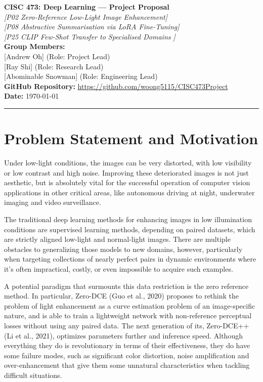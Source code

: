 \documentclass[11pt, letterpaper]{article}
\begin{document}
{\centering
  {\Large\textbf{CISC 473: Deep Learning --- Project Proposal}}\\[0.5em]
  {\large\textit{[P02 Zero-Reference Low-Light Image Enhancement]}}\\[0.4em]
  {\large\textit{[P08 Abstractive Summarisation via LoRA Fine-Tuning]}}\\[0.4em]
  {\large\textit{[P25 CLIP Few-Shot Transfer to Specialised Domains ]}}\\[0.4em]
  \textbf{Group Members:}\\{}
  [Andrew Oh] \quad [20284827] \quad (Role: Project Lead)\\{}
  [Ray Shi] \quad [20404836] \quad (Role: Research Lead)\\{}
  [Abominable Snowman] \quad [20353570] \quad (Role: Engineering Lead)\\[0.3em]
  \textbf{GitHub Repository:} \url{https://github.com/woong5115/CISC473Project}\\[0.3em]
  \textbf{Date:} \today\\[0.4em]
  \rule{\linewidth}{0.4pt}
}

\section{Problem Statement and Motivation}

Under low-light conditions, the images can be very distorted, with low visibility or low contrast and high noise. Improving these deteriorated images is not just aesthetic, but is absolutely vital for the successful operation of computer vision applications in other critical areas, like autonomous driving at night, underwater imaging and video surveillance.

The traditional deep learning methods for enhancing images in low illumination conditions are supervised learning methods, depending on paired datasets, which are strictly aligned low-light and normal-light images. There are multiple obstacles to generalizing those models to new domains, however, particularly when targeting collections of nearly perfect pairs in dynamic environments where it's often impractical, costly, or even impossible to acquire such examples.

A potential paradigm that surmounts this data restriction is the zero reference method. In particular, Zero-DCE (Guo et al., 2020) proposes to rethink the problem of light enhancement as a curve estimation problem of an image-specific nature, and is able to train a lightweight network with non-reference perceptual losses without using any paired data. The next generation of its, Zero-DCE++ (Li et al., 2021), optimizes parameters further and inference speed. Although everything they do is revolutionary in terms of their effectiveness, they do have some failure modes, such as significant color distortion, noise amplification and over-enhancement that give them some unnatural characteristics when tackling difficult situations.
\end{document}
